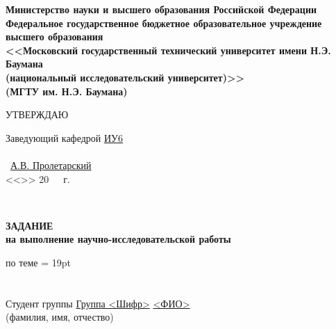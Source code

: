 \documentclass[12pt, left=25mm, right=15mm, top=20mm, bottom=10mm]{templateTaskBMSTU}
\begin{document}
	\thispagestyle{empty}
	\begin{center}
		\fontsize{11pt}{0.4\baselineskip}\selectfont \textbf{Министерство науки и высшего образования Российской Федерации 
		\\ Федеральное государственное бюджетное образовательное учреждение 
		\\ высшего образования 
		\\ <<Московский государственный технический университет имени Н.Э. Баумана
		\\ (национальный исследовательский университет)>>
		\\ (МГТУ им. Н.Э. Баумана)}
		
		\fontsize{12pt}{0.5\baselineskip}\selectfont
		\noindent \makebox[\linewidth]{\rule{\textwidth}{4pt}} \makebox[\linewidth]{\rule{\textwidth}{1pt}}
	\end{center}	
	
	\begin{flushright}
		\fontsize{12pt}{\baselineskip}\selectfont
		УТВЕРЖДАЮ \hspace*{1.4cm}

		\fontsize{12pt}{\baselineskip}\selectfont
		Заведующий кафедрой \uline{\hspace*{0.5cm}}\uline{ИУ6}\uline{\hspace*{0.5cm}} 
		\\ \
		\\ \hfill \uline{\hspace*{2.5cm}} \ \uline{А.В. Пролетарский} 
		\\ <<\uline{\hspace*{1cm}}>> \uline{\hspace*{2.5cm}} 20\ \ \   г. %
	\end{flushright}
	\
	\begin{center}
		\fontsize{18pt}{\baselineskip}\selectfont \textbf{ЗАДАНИЕ}
		\\ \fontsize{16pt}{\baselineskip}\selectfont \textbf{на выполнение научно-исследовательской работы}
	\end{center}

	\normalsize

	\begin{flushleft}
		по теме  \uline{\hfill} \baselineskip = 19pt
		\\ \uline{\hfill}
		\\ \uline{\hfill}
		\\ Студент группы  \uline{\hspace*{0.5cm}}\uline{Группа <Шифр>}\uline{\hspace*{0.5cm}}
		\center \uline{\hfill <ФИО> \hfill}
		\\ \fontsize{10pt}{\baselineskip}\selectfont(фамилия, имя, отчество)
	\end{flushleft}
\end{document}
